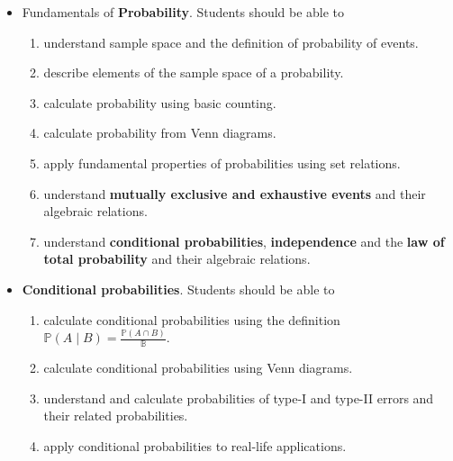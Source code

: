 \documentclass[../main.tex]{subfiles}
\begin{document}
\begin{itemize}
  \item Fundamentals of \textbf{Probability}.  Students should be able to 
    \begin{enumerate}
      \item understand sample space and the definition of probability of events.
      \item describe elements of the sample space of a probability.
      \item calculate probability using basic counting.
      \item calculate probability from Venn diagrams.
      \item apply fundamental properties of probabilities using set relations.
      \item understand \textbf{mutually exclusive and exhaustive events} and their algebraic relations.
      \item understand \textbf{conditional probabilities}, \textbf{independence} and the \textbf{law of total probability} and their algebraic relations.
    \end{enumerate}

  \item \textbf{Conditional probabilities}. Students should be able to
    \begin{enumerate}
      \item calculate conditional probabilities using the definition \(\mathbb{P}(A \mid B) = \frac{\mathbb{P}(A \cap B)}{\mathbb{\mathbb{B}}}\).
      \item calculate conditional probabilities using Venn diagrams.
      \item understand and calculate probabilities of type-I and type-II errors and their related probabilities.
      \item apply conditional probabilities to real-life applications.
    \end{enumerate}


\end{itemize}
\end{document}
